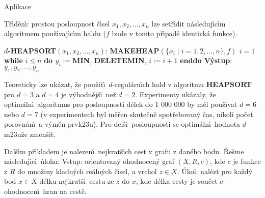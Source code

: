 \head
Aplikace 
\endhead

\flushpar T\v r\'\i d\v en\'\i : prostou posloupnost 
\v c\'\i sel $x_1,x_2,\dots,x_n$ lze set\v r\'\i dit n\'asleduj\'\i c\'\i m 
algoritmem pou\v z\'\i\-vaj\'\i c\'\i m haldu ($f$ bude v tomto p\v r\'\i pad\v e 
identick\'a funkce).
\bigskip

$d${\bf -HEAPSORT$(x_1,x_2,\dots,x_n)$}:\newline 
{\bf MAKEHEAP$(\{x_i\mid i=1,2,\dots,n\},f)$\newline 
$i=1$\newline 
while} $i\le n$ {\bf do\newline 
\phantom{{\rm ---}}$y_i:=$MIN}, {\bf DELETEMIN}, $i:=i+1$\newline 
{\bf enddo\newline 
V\'ystup}: $y_1,y_2,\dots,y_n$
\bigskip


\flushpar Teoreticky lze uk\'azat, \v ze pou\v zit\'\i\ $d$-regul\'arn\'\i ch hald v 
algoritmu {\bf HEAPSORT} pro $d=3$ a $d=4$ je v\'yhodn\v ej\v s\'\i\ 
ne\v z $d=2$. Experimenty uk\'azaly, \v ze optim\'aln\'\i\ 
algoritmus pro posloupnosti d\'elek do 1 000 000 by m\v el  
pou\v z\'\i vat $d=6$ nebo $d=7$ (v experimentech byl m\v e\v ren 
skute\v cn\v e spot\v rebovan\'y \v cas, nikoli po\v cet porovn\'an\'\i\ a 
v\'ym\v en prvk\accent23u). 
Pro del\v s\'\i\ posloupnosti se optim\'aln\'\i\ 
hodnota $d$ m\accent23u\v ze zmen\v sit.
\bigskip

\flushpar Dal\v s\'\i m p\v r\'\i kladem je nalezen\'\i\ nejkrat\v s\'\i ch cest v grafu z dan\'eho 
bodu. \v Re\v sme n\'asleduj\'\i c\'\i\ \'ulohu: \newline 
Vstup: orientovan\'y ohodnocen\'y graf $(X,R,c)$, kde $c$ je funkce z $
R$ do mno\v ziny kladn\'ych 
re\'aln\'ych \v c\'\i sel, a vrchol $z\in X$.\newline 
\'Ukol: nal\'ezt pro ka\v zd\'y bod $x\in X$ d\'elku 
nejkrat\v s\'\i\ cestu ze $z$ do $x$, kde d\'elka cesty je sou\v cet 
$c$-ohodnocen\'\i\ hran na cest\v e.
\bigskip

